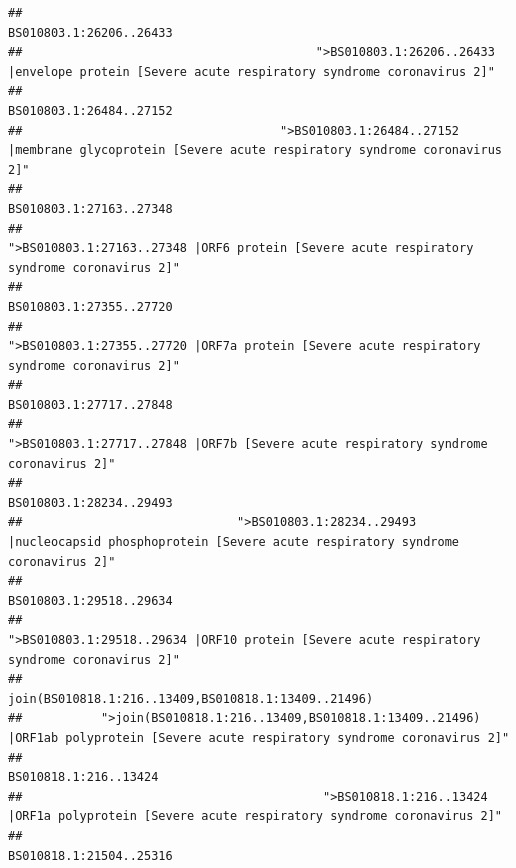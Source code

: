 \documentclass[
]{article}
\begin{document}
\begin{verbatim}
##                                                                                                                BS010803.1:26206..26433 
##                                         ">BS010803.1:26206..26433 |envelope protein [Severe acute respiratory syndrome coronavirus 2]" 
##                                                                                                                BS010803.1:26484..27152 
##                                    ">BS010803.1:26484..27152 |membrane glycoprotein [Severe acute respiratory syndrome coronavirus 2]" 
##                                                                                                                BS010803.1:27163..27348 
##                                             ">BS010803.1:27163..27348 |ORF6 protein [Severe acute respiratory syndrome coronavirus 2]" 
##                                                                                                                BS010803.1:27355..27720 
##                                            ">BS010803.1:27355..27720 |ORF7a protein [Severe acute respiratory syndrome coronavirus 2]" 
##                                                                                                                BS010803.1:27717..27848 
##                                                    ">BS010803.1:27717..27848 |ORF7b [Severe acute respiratory syndrome coronavirus 2]" 
##                                                                                                                BS010803.1:28234..29493 
##                              ">BS010803.1:28234..29493 |nucleocapsid phosphoprotein [Severe acute respiratory syndrome coronavirus 2]" 
##                                                                                                                BS010803.1:29518..29634 
##                                            ">BS010803.1:29518..29634 |ORF10 protein [Severe acute respiratory syndrome coronavirus 2]" 
##                                                                                    join(BS010818.1:216..13409,BS010818.1:13409..21496) 
##           ">join(BS010818.1:216..13409,BS010818.1:13409..21496) |ORF1ab polyprotein [Severe acute respiratory syndrome coronavirus 2]" 
##                                                                                                                  BS010818.1:216..13424 
##                                          ">BS010818.1:216..13424 |ORF1a polyprotein [Severe acute respiratory syndrome coronavirus 2]" 
##                                                                                                                BS010818.1:21504..25316 

\end{verbatim}
\end{document}
